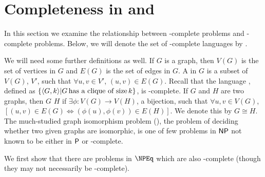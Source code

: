 \section{Completeness in \texorpdfstring{\NPEq}{NPEq} and \texorpdfstring{\NP}{NP}}

In this section we examine the relationship between \NP-complete problems and \NPEq-complete problems.
Below, we will denote the set of \NP-complete languages by \NPC.

We will need some further definitions as well.
If $G$ is a graph, then $V(G)$ is the set of vertices in $G$ and $E(G)$ is the set of edges in $G$.
A  in $G$ is a subset of $V(G)$, $V'$, such that $\forall u,v\in V'$, $(u, v)\in E(G)$.
Recall that the language , defined as $\{\pair{G}{k}|G \plain{has a clique of size} k\}$,  is \NP-complete.
If $G$ and $H$ are two graphs, then $G$  $H$ if $\exists\phi\colon V(G)\to V(H)$, a bijection, such that $\forall u,v\in V(G)$, $[(u,v)\in E(G)\iff (\phi(u), \phi(v))\in E(H)]$.
We denote this by $G\cong H$.
The much-studied graph isomorphism problem (\GI), the problem of deciding whether two given graphs are isomorphic, is one of few problems in $\NP$ not known to be either in $\P$ or \NP-complete.

We first show that there are problems in $\NPEq$ which are also \NP-complete (though they may not necessarily be \NPEq-complete).

